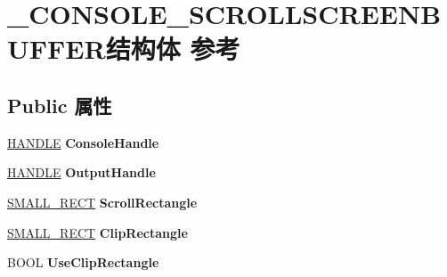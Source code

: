 \hypertarget{struct___c_o_n_s_o_l_e___s_c_r_o_l_l_s_c_r_e_e_n_b_u_f_f_e_r}{}\section{\+\_\+\+C\+O\+N\+S\+O\+L\+E\+\_\+\+S\+C\+R\+O\+L\+L\+S\+C\+R\+E\+E\+N\+B\+U\+F\+F\+E\+R结构体 参考}
\label{struct___c_o_n_s_o_l_e___s_c_r_o_l_l_s_c_r_e_e_n_b_u_f_f_e_r}
\subsection*{Public 属性}
\begin{DoxyCompactItemize}
\item 
\mbox{\label{struct___c_o_n_s_o_l_e___s_c_r_o_l_l_s_c_r_e_e_n_b_u_f_f_e_r_a66d310eb2b8dc493a11fe6f3b04a84a0}} 
\hyperlink{interfacevoid}{H\+A\+N\+D\+LE} {\bfseries Console\+Handle}
\item 
\mbox{\label{struct___c_o_n_s_o_l_e___s_c_r_o_l_l_s_c_r_e_e_n_b_u_f_f_e_r_a01b5b2269c728152b2b03ddbeaadda86}} 
\hyperlink{interfacevoid}{H\+A\+N\+D\+LE} {\bfseries Output\+Handle}
\item 
\mbox{\label{struct___c_o_n_s_o_l_e___s_c_r_o_l_l_s_c_r_e_e_n_b_u_f_f_e_r_ad65729b144419c462bf80ac61430b7f6}} 
\hyperlink{structtag_s_m_a_l_l___r_e_c_t}{S\+M\+A\+L\+L\+\_\+\+R\+E\+CT} {\bfseries Scroll\+Rectangle}
\item 
\mbox{\label{struct___c_o_n_s_o_l_e___s_c_r_o_l_l_s_c_r_e_e_n_b_u_f_f_e_r_a1bde3a9efc7cdc76960f38e7781272db}} 
\hyperlink{structtag_s_m_a_l_l___r_e_c_t}{S\+M\+A\+L\+L\+\_\+\+R\+E\+CT} {\bfseries Clip\+Rectangle}
\item 
\mbox{\label{struct___c_o_n_s_o_l_e___s_c_r_o_l_l_s_c_r_e_e_n_b_u_f_f_e_r_aa7e2d329e4bacc387e3f0b81c66d70f0}} 
B\+O\+OL {\bfseries Use\+Clip\+Rectangle}
\item 

\end{DoxyCompactItemize}
